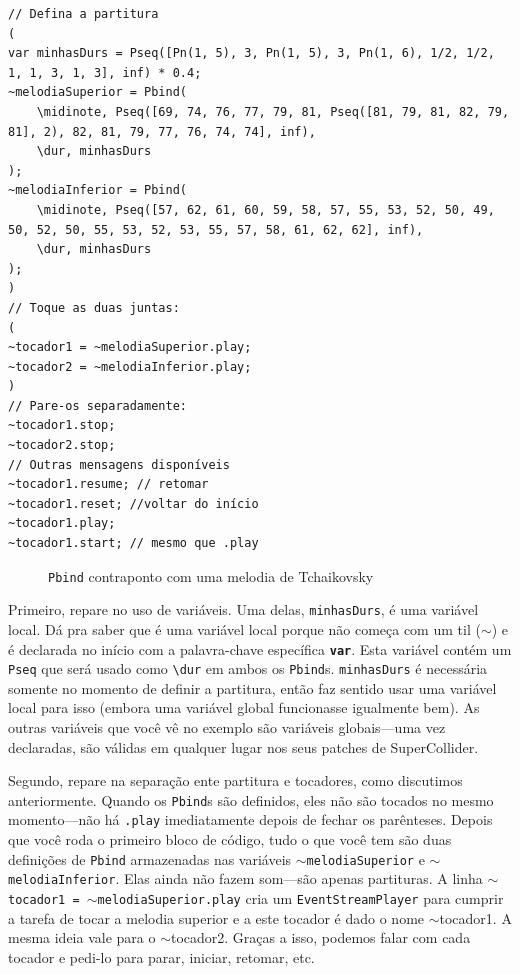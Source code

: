 %

\begin{lstlisting}[style=SuperCollider-IDE, basicstyle=\scttfamily\footnotesize]
// Defina a partitura
(
var minhasDurs = Pseq([Pn(1, 5), 3, Pn(1, 5), 3, Pn(1, 6), 1/2, 1/2, 1, 1, 3, 1, 3], inf) * 0.4;
~melodiaSuperior = Pbind(
	\midinote, Pseq([69, 74, 76, 77, 79, 81, Pseq([81, 79, 81, 82, 79, 81], 2), 82, 81, 79, 77, 76, 74, 74], inf),
	\dur, minhasDurs
);
~melodiaInferior = Pbind(
	\midinote, Pseq([57, 62, 61, 60, 59, 58, 57, 55, 53, 52, 50, 49, 50, 52, 50, 55, 53, 52, 53, 55, 57, 58, 61, 62, 62], inf),
	\dur, minhasDurs
);
)
// Toque as duas juntas:
(
~tocador1 = ~melodiaSuperior.play;
~tocador2 = ~melodiaInferior.play;
)
// Pare-os separadamente:
~tocador1.stop;
~tocador2.stop;
// Outras mensagens disponíveis
~tocador1.resume; // retomar
~tocador1.reset; //voltar do início
~tocador1.play;
~tocador1.start; // mesmo que .play
\end{lstlisting}

\begin{figure}[h]
\centerline{}
\caption{\texttt{Pbind} contraponto com uma melodia de Tchaikovsky}
\label{fig:counterpoint}
\end{figure}

Primeiro, repare no uso de variáveis. Uma delas, \texttt{minhasDurs}, é uma variável local. Dá pra saber que é uma variável local porque não começa com um til ($\sim$) e é declarada no início com a palavra-chave específica \texttt{\textbf{var}}. Esta variável contém um \texttt{Pseq} que será usado como \texttt{\textbackslash dur} em ambos os \texttt{Pbind}s. \texttt{minhasDurs} é necessária somente no momento de definir a partitura, então faz sentido usar uma variável local para isso (embora uma variável global funcionasse igualmente bem). As outras variáveis que você vê no exemplo são variáveis globais---uma vez declaradas, são válidas em qualquer lugar nos seus patches de SuperCollider.

Segundo, repare na separação ente partitura e tocadores, como discutimos anteriormente. Quando os \texttt{Pbind}s são definidos, eles não são tocados no mesmo momento---não há \texttt{.play} imediatamente depois de fechar os parênteses. Depois que você roda o primeiro bloco de código, tudo o que você tem são duas definições de \texttt{Pbind} armazenadas nas variáveis \texttt{$\sim$melodiaSuperior} e \texttt{$\sim$melodiaInferior}. Elas ainda não fazem som---são apenas partituras. A linha \texttt{$\sim$tocador1 = $\sim$melodiaSuperior.play} cria um \texttt{EventStreamPlayer} para cumprir a tarefa de tocar a melodia superior e a este tocador é dado o nome $\sim$tocador1. A mesma ideia vale para o $\sim$tocador2. Graças a isso, podemos falar com cada tocador e pedi-lo para parar, iniciar, retomar, etc.

